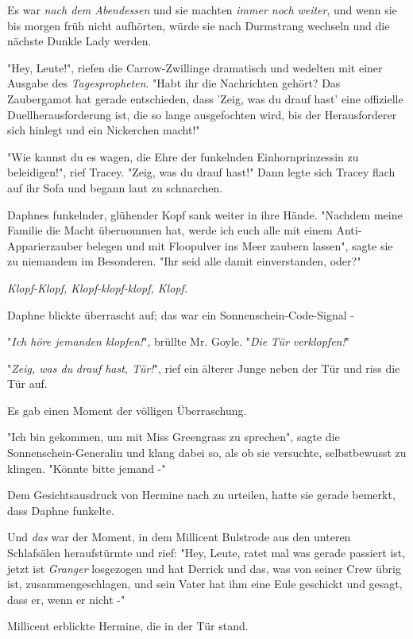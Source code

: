 {Es war \emph{nach dem Abendessen} und sie machten \emph{immer noch} \emph{weiter}, und wenn sie bis morgen früh nicht aufhörten, würde sie nach Durmstrang wechseln und die nächste Dunkle Lady werden.

"Hey, Leute!", riefen die Carrow-Zwillinge dramatisch und wedelten mit einer Ausgabe des \emph{Tagespropheten}. "Habt ihr die Nachrichten gehört? Das Zaubergamot hat gerade entschieden, dass 'Zeig, was du drauf hast' eine offizielle Duellherausforderung ist, die so lange ausgefochten wird, bis der Herausforderer sich hinlegt und ein Nickerchen macht!"

"Wie kannst du es wagen, die Ehre der funkelnden Einhornprinzessin zu beleidigen!", rief Tracey. "Zeig, was du drauf hast!" Dann legte sich Tracey flach auf ihr Sofa und begann laut zu schnarchen.

Daphnes funkelnder, glühender Kopf sank weiter in ihre Hände. "Nachdem meine Familie die Macht übernommen hat, werde ich euch alle mit einem Anti-Apparierzauber belegen und mit Floopulver ins Meer zaubern lassen", sagte sie zu niemandem im Besonderen. "Ihr seid alle damit einverstanden, oder?"

\emph{\emph{Klopf-Klopf, Klopf-klopf-klopf, Klopf.}}

Daphne blickte überrascht auf; das war ein Sonnenschein-Code-Signal -

"\emph{Ich höre jemanden klopfen!}", brüllte Mr. Goyle. "\emph{Die} \emph{Tür} \emph{verklopfen!}"

"\emph{Zeig, was du} \emph{drauf hast, Tür!}", rief ein älterer Junge neben der Tür und riss die Tür auf.

Es gab einen Moment der völligen Überraschung.

"Ich bin gekommen, um mit Miss Greengrass zu sprechen", sagte die Sonnenschein-Generalin und klang dabei so, als ob sie versuchte, selbstbewusst zu klingen. "Könnte bitte jemand -"

Dem Gesichtsausdruck von Hermine nach zu urteilen, hatte sie gerade bemerkt, dass Daphne funkelte.

Und \emph{das} war der Moment, in dem Millicent Bulstrode aus den unteren Schlafsälen heraufstürmte und rief: "Hey, Leute, ratet mal was gerade passiert ist, jetzt ist \emph{Granger} losgezogen und hat Derrick und das, was von seiner Crew übrig ist, zusammengeschlagen, und sein Vater hat ihm eine Eule geschickt und gesagt, dass er, wenn er nicht -"

Millicent erblickte Hermine, die in der Tür stand.

}
